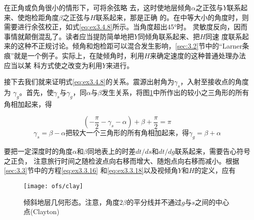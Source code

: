 在正角或负角很小的情形下，可将余弦略
去，这时使地层倾角$\alpha$之正弦与$Y$联系起来、使炮检距角度$\beta$之正弦与$H$联系起来，那是正确
的。在中等大小的角度时，则需要进行余弦校正，如式\ref{eq:ex3.4.8}所示。当角度超出45°时。
灵敏度反向，因而事情就颠倒混乱了。读者应当提防简单地把$Y$同倾角联系起来、把$H$同速
度联系起来的这种不正规讨论。倾角和炮检距可以混合发生影响，\ref{sec:3.2}节中的“Larner条
痕”就是一个例子。实际上，在陡倾角时，利用$H$来确定速度的这种普通处理办法应当以某
科方式使之改变为利用$Y$来进行。

接下去我们就来证明式\ref{eq:ex3.4.8}的关系。震源出射角为$\gamma_s$，入射至接收点的角度为
$\gamma_g$。首先，使$\gamma_s$与$\gamma_g$，同$\alpha$与$\beta$发生关系，将图\ref{fig:ofs/clay}中所作出的较小之三角形的所有角相加起来，得

\begin{equation*}
(-\frac{\pi}{2}-\gamma_s-\alpha)+\beta+\frac{\pi}{2}=\pi
\end{equation*}
\begin{subequations}
\begin{equation}
\gamma_s=\beta-\alpha
\label{eq:ex3.4.9a}
\end{equation}
把较大一个三角形的所有角相加起来，得
\begin{equation}
\gamma_g=\beta+\alpha
\label{eq:ex3.4.9b}
\end{equation}
\label{eq:ex3.4.9}
\end{subequations}

要把一定深度时的角度$\alpha$和$\beta$同地表上的时差$dt/ds$和$dt/dg$联系起来，需要告心符号之正负，
注意旅行时间之随检波点向右移而增大、随炮点向右移而减小。根据\ref{sec:3.3}节中的方程\ref{eq:ex3.3.16}
和\ref{eq:ex3.3.18}以及视倾角$Y$和$H$的定义，应有

\begin{figure}[H]
\centering
\texttt{[image: ofs/clay]}
\caption[clay]{倾斜地层几何形态。注意，角度$2\beta$的平分线并不通过$g$与$s$之间的中心点(Clayton)}
\label{fig:ofs/clay}
\end{figure}
